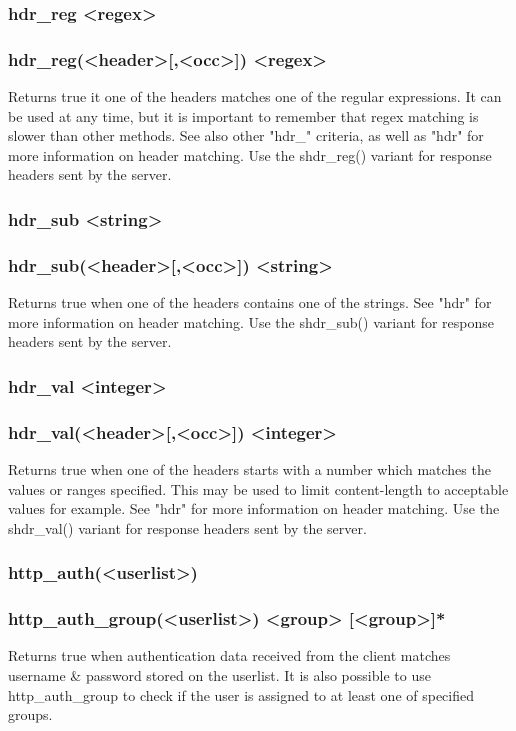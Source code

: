\subsubsection[hdr\_reg]{hdr\_reg <regex>}
\subsubsection*{hdr\_reg(<header>[,<occ>]) <regex>}
  Returns true it one of the headers matches one of the regular expressions. It
  can be used at any time, but it is important to remember that regex matching
  is slower than other methods. See also other "hdr\_" criteria, as well as
  "hdr" for more information on header matching. Use the shdr\_reg() variant for
  response headers sent by the server.

\subsubsection[hdr\_sub]{hdr\_sub <string>}
\subsubsection*{hdr\_sub(<header>[,<occ>]) <string>}
  Returns true when one of the headers contains one of the strings. See "hdr"
  for more information on header matching. Use the shdr\_sub() variant for
  response headers sent by the server.

\subsubsection[hdr\_val]{hdr\_val <integer>}
\subsubsection{hdr\_val(<header>[,<occ>]) <integer>}
  Returns true when one of the headers starts with a number which matches the
  values or ranges specified. This may be used to limit content-length to
  acceptable values for example. See "hdr" for more information on header
  matching. Use the shdr\_val() variant for response headers sent by the server.

\subsubsection[http\_auth]{http\_auth(<userlist>)}
\subsubsection[http\_auth\_group]{http\_auth\_group(<userlist>) <group> [<group>]*}
  Returns true when authentication data received from the client matches
  username \& password stored on the userlist. It is also possible to
  use http\_auth\_group to check if the user is assigned to at least one
  of specified groups.

